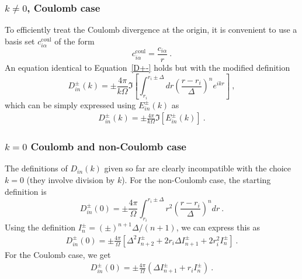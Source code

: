 \subsubsection{$k\ne 0$, Coulomb case}
To efficiently treat the Coulomb divergence at the origin, it is convenient to use
a basis set $c_{i\alpha}^{\text{coul}}$ of the form 
\begin{equation}
c_{i\alpha}^{\text{coul}}=\frac{c_{i\alpha}}{r}\:.
\end{equation}
An equation identical to Equation~\ref{D+-} holds but with the modified definition
\begin{equation}
D_{in}^\pm(k)=\pm\frac{4\pi}{k\Omega}\Im\left[\int_{r_i}^{r_i\pm\Delta}
dr\left(\frac{r-r_i}{\Delta}\right)^n e^{ikr}\right]\:,
\end{equation}
which can be simply expressed using $E^\pm_{in}(k)$ as
\begin{eqnarray}
D_{in}^\pm(k)=\pm\frac{4\pi}{k\Omega}\Im\left[E_{in}^\pm(k)\right]\:.
\label{coulD+-}
\end{eqnarray}
\subsubsection{$k=0$ Coulomb and non-Coulomb case}
The definitions of $D_{in}(k)$ given so far are clearly incompatible 
with the choice $k=0$ (they involve division by $k$). For the non-Coulomb
case, the starting definition is
\begin{equation}
D^\pm_{in}(0)=\pm\frac{4\pi}{\Omega}\int_{r_i}^{r_i\pm\Delta}r^2
\left(\frac{r-r_i}{\Delta}\right)^ndr\:.
\end{equation}
Using the definition $I_n^\pm=(\pm)^{n+1}\Delta/(n+1)$, we can express this
as
\begin{eqnarray}
D^\pm_{in}(0)=\pm\frac{4\pi}{\Omega}\left[\Delta^2 I_{n+2}^\pm
+2r_i\Delta I_{n+1}^\pm+2r_i^2I_n^\pm\right]\:.
\label{noncoul_k=0D+-}
\end{eqnarray}
For the Coulomb case, we get
\begin{eqnarray}
D^\pm_{in}(0)=\pm\frac{4\pi}{\Omega}\left(
\Delta I^\pm_{n+1} + r_i I^\pm_n\right)\:.
\label{coul_k=0D+-}
\end{eqnarray}

